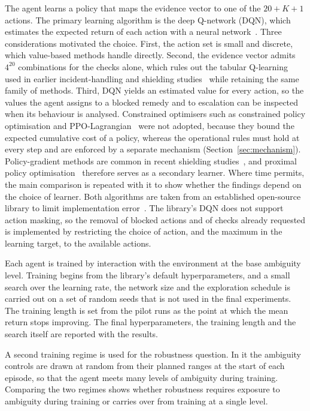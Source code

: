 The agent learns a policy that maps the evidence vector to one of the $20 + K + 1$ actions. The primary learning algorithm is the deep Q-network (DQN), which estimates the expected return of each action with a neural network~\cite{mnih2015}. Three considerations motivated the choice. First, the action set is small and discrete, which value-based methods handle directly. Second, the evidence vector admits $4^{20}$ combinations for the checks alone, which rules out the tabular Q-learning used in earlier incident-handling and shielding studies~\cite{dunsin2025,alshiekh2018} while retaining the same family of methods. Third, DQN yields an estimated value for every action, so the values the agent assigns to a blocked remedy and to escalation can be inspected when its behaviour is analysed. Constrained optimisers such as constrained policy optimisation and PPO-Lagrangian~\cite{achiam2017,zhang2026falcon} were not adopted, because they bound the expected cumulative cost of a policy, whereas the operational rules must hold at every step and are enforced by a separate mechanism (Section~\ref{sec:mechanism}). Policy-gradient methods are common in recent shielding studies~\cite{yang2023,konighofer2025}, and proximal policy optimisation~\cite{schulman2017} therefore serves as a secondary learner. Where time permits, the main comparison is repeated with it to show whether the findings depend on the choice of learner. Both algorithms are taken from an established open-source library to limit implementation error~\cite{raffin2021}. The library's DQN does not support action masking, so the removal of blocked actions and of checks already requested is implemented by restricting the choice of action, and the maximum in the learning target, to the available actions.

Each agent is trained by interaction with the environment at the base ambiguity level. Training begins from the library's default hyperparameters, and a small search over the learning rate, the network size and the exploration schedule is carried out on a set of random seeds that is not used in the final experiments. The training length is set from the pilot runs as the point at which the mean return stops improving. The final hyperparameters, the training length and the search itself are reported with the results.

A second training regime is used for the robustness question. In it the ambiguity controls are drawn at random from their planned ranges at the start of each episode, so that the agent meets many levels of ambiguity during training. Comparing the two regimes shows whether robustness requires exposure to ambiguity during training or carries over from training at a single level.

